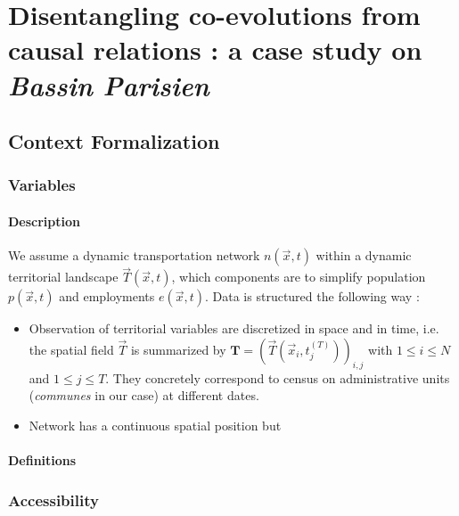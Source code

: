 
\section{Disentangling co-evolutions from causal relations : a case study on \emph{Bassin Parisien}}




\subsection{Context Formalization}

\subsubsection{Variables}

\paragraph{Description}

We assume a dynamic transportation network $n(\vec{x},t)$ within a dynamic territorial landscape $\vec{T}(\vec{x},t)$, which components are to simplify population $p(\vec{x},t)$ and employments $e(\vec{x},t)$. Data is structured the following way :
\begin{itemize}
\item Observation of territorial variables are discretized in space and in time, i.e. the spatial field $\vec{T}$ is summarized by $\mathbf{T} = \left(\vec{T}(\vec{x}_i,t_j^{(T)})\right)_{i,j}$ with $1\leq i \leq N$ and $1\leq j \leq T$. They concretely correspond to census on administrative units (\emph{communes} in our case) at different dates.
\item Network has a continuous spatial position but
\end{itemize}



\paragraph{Definitions}



\subsubsection{Accessibility}


